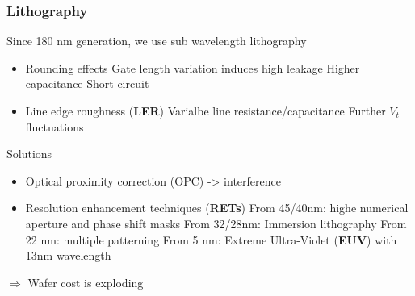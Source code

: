 \subsubsection{Lithography}
Since 180 nm generation, we use sub wavelength lithography
\begin{itemize}
  \item Rounding effects
  \subitem Gate length variation induces high leakage
  \subitem Higher capacitance
  \subitem Short circuit
\item Line edge roughness (\textbf{LER})
  \subitem Varialbe line resistance/capacitance
  \subitem Further \(V_t\) fluctuations
\end{itemize}

Solutions
\begin{itemize}
 \item Optical proximity correction (OPC) -> interference
 \item Resolution enhancement techniques (\textbf{RETs})
      \subitem From 45/40nm: highe numerical aperture and phase shift masks
      \subitem From 32/28nm: Immersion lithography
      \subitem From 22 nm: multiple patterning
      \subitem From 5 nm: Extreme Ultra-Violet (\textbf{EUV}) with 13nm wavelength
\end{itemize}
\(\Rightarrow\) Wafer cost is exploding


